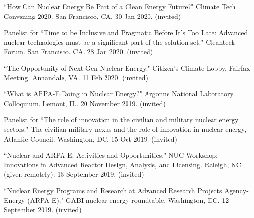 \begin{bibsection}

\item ``How Can Nuclear Energy Be Part of a Clean Energy Future?" Climate Tech Convening 2020. San Francisco, CA. 30 Jan 2020.
(invited)

\item Panelist for ``Time to be Inclusive and Pragmatic Before It’s Too Late: Advanced nuclear technologies must be a significant part of the solution set." Cleantech Forum. San Francisco, CA. 28 Jan 2020.
(invited)

\item ``The Opportunity of Next-Gen Nuclear Energy." Citizen's Climate Lobby, Fairfax Meeting. Annandale, VA. 11 Feb 2020. (invited)

\item ``What is ARPA-E Doing in Nuclear Energy?" Argonne National
Laboratory Colloquium. Lemont, IL. 20 November 2019. (invited)


\item Panelist for ``The role of innovation in the civilian and
military nuclear energy sectors." The civilian-military nexus and the role of
innovation in nuclear energy, Atlantic Council. Washington, DC. 15 Oct 2019.
(invited)


\item ``Nuclear and ARPA-E: Activities and Opportunities." NUC
Workshop: Innovations in Advanced Reactor Design, Analysis, and Licensing.
Raleigh, NC (given remotely). 18 September 2019. (invited)

\item ``Nuclear Energy Programs and Research at Advanced
Research Projects Agency-Energy (ARPA-E)." GABI nuclear energy roundtable.
Washington, DC. 12 September 2019. (invited)



\end{bibsection}

